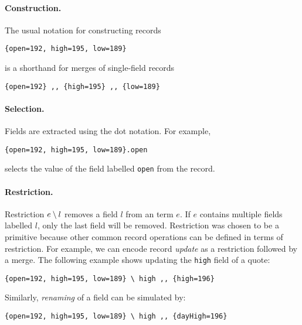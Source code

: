 \paragraph{Construction.} The usual notation for constructing records
\begin{lstlisting}
{open=192, high=195, low=189}
\end{lstlisting}
is a shorthand for merges of single-field records
\begin{lstlisting}
{open=192} ,, {high=195} ,, {low=189}
\end{lstlisting}

\paragraph{Selection.}
Fields are extracted using the dot notation. For example,
\begin{lstlisting}
{open=192, high=195, low=189}.open
\end{lstlisting}
selects the value of the field labelled \lstinline{open} from the record.

\paragraph{Restriction.}
Restriction $e \setminus l$ removes a field $l$ from an term $e$. If $e$
contains multiple fields labelled $l$, only the last field will be removed.
Restriction was chosen to be a primitive because other common
record operations can be defined in terms of restriction. For example, we can encode record
\emph{update} as a restriction followed by a merge. The following example
shows updating the \lstinline{high} field of a quote:
\begin{lstlisting}
{open=192, high=195, low=189} \ high ,, {high=196}
\end{lstlisting}
Similarly, \emph{renaming} of a field can be simulated by:
\begin{lstlisting}
{open=192, high=195, low=189} \ high ,, {dayHigh=196}
\end{lstlisting}

\begin{comment}
Refinement of fields is also possible, in the sense
that the type of a new value can be a subtype of that of the old
one.~\footnote{The subtyping restriction is not required for the \name to be
  coherent and it leaves option open for language designers.}
\bruno{Are we going to show an example of this?}
\end{comment}

